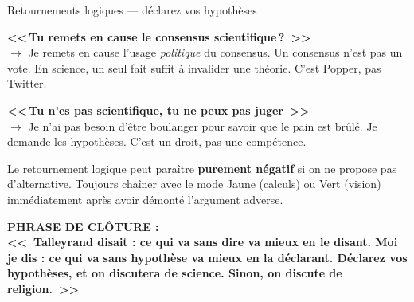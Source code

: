 \documentclass[a4paper,11pt]{article}
\begin{document}
\begin{ficheorange}{Retournements logiques --- d\'{e}clarez vos hypoth\`{e}ses}
\begin{contrearg}
\textbf{<<\,Tu remets en cause le consensus scientifique\,?~>>}\\
$\rightarrow$ Je remets en cause l'usage \emph{politique} du consensus. Un consensus n'est pas un vote. En science, un seul fait suffit \`{a} invalider une th\'{e}orie. C'est Popper, pas Twitter.

\textbf{<<\,Tu n'es pas scientifique, tu ne peux pas juger~>>}\\
$\rightarrow$ Je n'ai pas besoin d'\^{e}tre boulanger pour savoir que le pain est br\^{u}l\'{e}. Je demande les hypoth\`{e}ses. C'est un droit, pas une comp\'{e}tence.
\end{contrearg}

\begin{anglemort}
Le retournement logique peut para\^{i}tre \textbf{purement n\'{e}gatif} si on ne propose pas d'alternative. Toujours cha\^{i}ner avec le mode Jaune (calculs) ou Vert (vision) imm\'{e}diatement apr\`{e}s avoir d\'{e}mont\'{e} l'argument adverse.
\end{anglemort}

\vspace{0.3cm}
\textbf{\color{ModeOrange}PHRASE DE CL\^{O}TURE :}\\
\textbf{\textcolor{ModeOrange}{<<~Talleyrand disait : ce qui va sans dire va mieux en le disant. Moi je dis : ce qui va sans hypoth\`{e}se va mieux en la d\'{e}clarant. D\'{e}clarez vos hypoth\`{e}ses, et on discutera de science. Sinon, on discute de religion.~>>}}

\end{ficheorange}

\newpage

\end{document}
